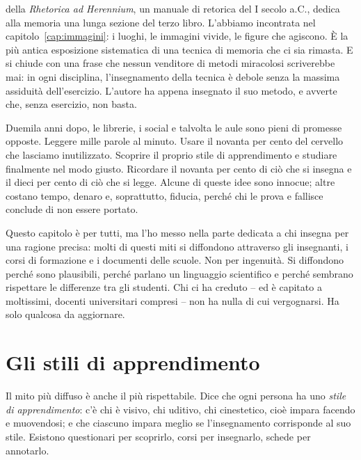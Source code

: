  della \emph{Rhetorica ad Herennium},
un manuale di retorica del I secolo a.C., dedica
alla memoria una lunga sezione del terzo libro. L'abbiamo incontrata
nel capitolo~\ref{cap:immagini}: i luoghi, le immagini vivide, le
figure che agiscono. È la più antica esposizione sistematica di una
tecnica di memoria che ci sia rimasta. E si chiude con una frase che
nessun venditore di metodi miracolosi scriverebbe mai: in ogni
disciplina, l'insegnamento della tecnica è debole senza la massima
assiduità dell'esercizio. L'autore ha appena insegnato il suo
metodo, e avverte che, senza esercizio, non basta.

Duemila anni dopo, le librerie, i social e talvolta le aule sono pieni
di promesse opposte. Leggere mille parole al minuto. Usare il novanta
per cento del cervello che lasciamo inutilizzato. Scoprire il proprio
stile di apprendimento e studiare finalmente nel modo giusto. Ricordare
il novanta per cento di ciò che si insegna e il dieci per cento di
ciò che si legge. Alcune di queste idee sono innocue; altre costano
tempo, denaro e, soprattutto, fiducia, perché chi le prova e fallisce
conclude di non essere portato.

Questo capitolo è per tutti, ma l'ho messo nella parte dedicata a chi
insegna per una ragione precisa: molti di questi miti si diffondono
attraverso gli insegnanti, i corsi di formazione e i documenti delle
scuole. Non per ingenuità. Si diffondono perché sono plausibili,
perché parlano un linguaggio scientifico e perché sembrano rispettare
le differenze tra gli studenti. Chi ci ha creduto -- ed è capitato a
moltissimi, docenti universitari compresi -- non ha nulla di cui
vergognarsi. Ha solo qualcosa da aggiornare.

\section{Gli stili di apprendimento}

Il mito più diffuso è anche il più rispettabile. Dice che ogni persona
ha uno \emph{stile di apprendimento}: c'è chi è visivo, chi uditivo,
chi cinestetico, cioè impara facendo e muovendosi; e che ciascuno
impara meglio se l'insegnamento corrisponde al suo stile. Esistono
questionari per scoprirlo, corsi per insegnarlo, schede per
annotarlo.

